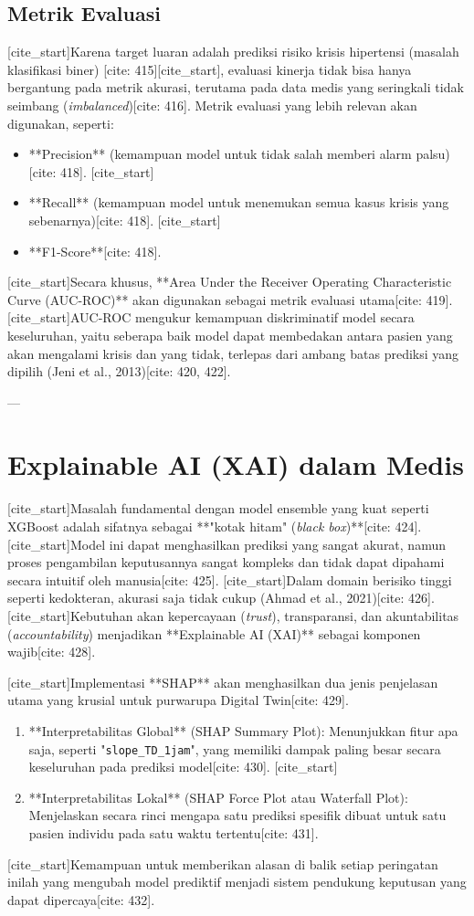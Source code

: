 \subsection{Metrik Evaluasi}
[cite_start]Karena target luaran adalah prediksi risiko krisis hipertensi (masalah klasifikasi biner) [cite: 415][cite_start], evaluasi kinerja tidak bisa hanya bergantung pada metrik akurasi, terutama pada data medis yang seringkali tidak seimbang (\textit{imbalanced})[cite: 416]. Metrik evaluasi yang lebih relevan akan digunakan, seperti:
\begin{itemize}
    [cite_start]\item **Precision** (kemampuan model untuk tidak salah memberi alarm palsu)[cite: 418].
    [cite_start]\item **Recall** (kemampuan model untuk menemukan semua kasus krisis yang sebenarnya)[cite: 418].
    [cite_start]\item **F1-Score**[cite: 418].
\end{itemize}
[cite_start]Secara khusus, **Area Under the Receiver Operating Characteristic Curve (AUC-ROC)** akan digunakan sebagai metrik evaluasi utama[cite: 419]. [cite_start]AUC-ROC mengukur kemampuan diskriminatif model secara keseluruhan, yaitu seberapa baik model dapat membedakan antara pasien yang akan mengalami krisis dan yang tidak, terlepas dari ambang batas prediksi yang dipilih (Jeni et al., 2013)[cite: 420, 422].

---
\section{Explainable AI (XAI) dalam Medis}
[cite_start]Masalah fundamental dengan model ensemble yang kuat seperti XGBoost adalah sifatnya sebagai **"kotak hitam" (\textit{black box})**[cite: 424]. [cite_start]Model ini dapat menghasilkan prediksi yang sangat akurat, namun proses pengambilan keputusannya sangat kompleks dan tidak dapat dipahami secara intuitif oleh manusia[cite: 425]. [cite_start]Dalam domain berisiko tinggi seperti kedokteran, akurasi saja tidak cukup (Ahmad et al., 2021)[cite: 426]. [cite_start]Kebutuhan akan kepercayaan (\textit{trust}), transparansi, dan akuntabilitas (\textit{accountability}) menjadikan **Explainable AI (XAI)** sebagai komponen wajib[cite: 428].

[cite_start]Implementasi **SHAP** akan menghasilkan dua jenis penjelasan utama yang krusial untuk purwarupa Digital Twin[cite: 429].
\begin{enumerate}
    \item **Interpretabilitas Global** (SHAP Summary Plot): Menunjukkan fitur apa saja, seperti "\texttt{slope\_TD\_1jam}", yang memiliki dampak paling besar secara keseluruhan pada prediksi model[cite: 430].
    [cite_start]\item **Interpretabilitas Lokal** (SHAP Force Plot atau Waterfall Plot): Menjelaskan secara rinci mengapa satu prediksi spesifik dibuat untuk satu pasien individu pada satu waktu tertentu[cite: 431].
\end{enumerate}
[cite_start]Kemampuan untuk memberikan alasan di balik setiap peringatan inilah yang mengubah model prediktif menjadi sistem pendukung keputusan yang dapat dipercaya[cite: 432].

